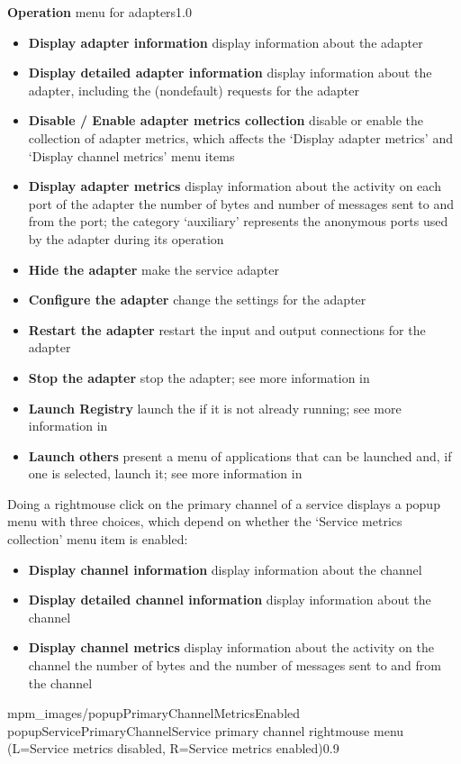 %
{\textbf{Operation} menu for adapters}{1.0}
\begin{itemize}
\item\textbf{Display adapter information} display information about the adapter
\item\exSp\textbf{Display detailed adapter information} display information about the
adapter, including the (non\longDash{}default) requests for the adapter
\item\exSp\textbf{Disable / Enable adapter metrics collection} disable or enable the
collection of adapter metrics, which affects the `Display adapter metrics' and `Display
channel metrics' menu items
\item\exSp\textbf{Display adapter metrics} display information about the activity on each
port of the adapter \longDash{} the number of bytes and number of messages sent to and
from the port; the category `auxiliary' represents the anonymous ports used by the adapter
during its operation
\item\exSp\textbf{Hide the adapter} make the service adapter
\item\exSp\textbf{Configure the adapter} change the settings for the adapter
\item\exSp\textbf{Restart the adapter} restart the input and output connections for the
adapter
\item\exSp\textbf{Stop the adapter} stop the adapter; see more information in
\item\exSp\textbf{Launch Registry} launch the \emph{\RS} if it is not already running; see
more information in\\
\item\exSp\textbf{Launch others \textellipsis} present a menu of applications that can be
launched and, if one is selected, launch it; see more information in
\end{itemize}
\condPage{}
Doing a right\longDash{}mouse click on the primary channel of a service displays a popup
menu with three choices, which depend on whether the `Service metrics collection' menu
item is enabled:
\begin{itemize}
\item\textbf{Display channel information} display information about the channel
\item\exSp\textbf{Display detailed channel information} display information about the
channel
\item\exSp\textbf{Display channel metrics} display information about the activity on the
channel \longDash{} the number of bytes and the number of messages sent to and from the
channel
\end{itemize}
%
{mpm_images/popupPrimaryChannelMetricsEnabled}%
{popupServicePrimaryChannel}{Service primary channel right\longDash{}mouse menu 
(L=Service metrics disabled, R=Service metrics enabled)}{0.9}

